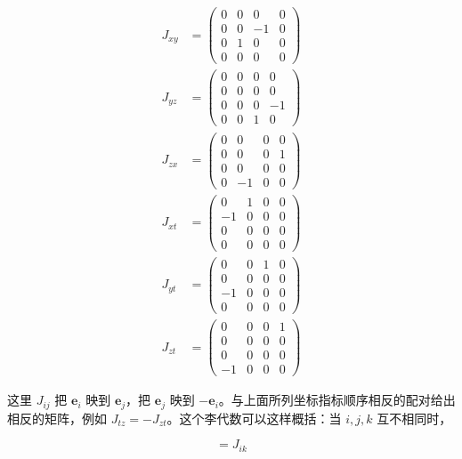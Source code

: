 \begin{align}
J_{xy} &= \begin{pmatrix} 0 & 0 & 0 & 0 \\ 0 & 0 & -1 & 0 \\ 0 & 1 & 0 & 0 \\ 0 & 0 & 0 & 0 \end{pmatrix} \\
J_{yz} &= \begin{pmatrix} 0 & 0 & 0 & 0 \\ 0 & 0 & 0 & 0 \\ 0 & 0 & 0 & -1 \\ 0 & 0 & 1 & 0 \end{pmatrix} \\
J_{zx} &= \begin{pmatrix} 0 & 0 & 0 & 0 \\ 0 & 0 & 0 & 1 \\ 0 & 0 & 0 & 0 \\ 0 & -1 & 0 & 0 \end{pmatrix} \\
J_{xt} &= \begin{pmatrix} 0 & 1 & 0 & 0 \\ -1 & 0 & 0 & 0 \\ 0 & 0 & 0 & 0 \\ 0 & 0 & 0 & 0 \end{pmatrix} \\
J_{yt} &= \begin{pmatrix} 0 & 0 & 1 & 0 \\ 0 & 0 & 0 & 0 \\ -1 & 0 & 0 & 0 \\ 0 & 0 & 0 & 0 \end{pmatrix} \\
J_{zt} &= \begin{pmatrix} 0 & 0 & 0 & 1 \\ 0 & 0 & 0 & 0 \\ 0 & 0 & 0 & 0 \\ -1 & 0 & 0 & 0 \end{pmatrix}
\end{align}

这里 $J_{ij}$ 把 $\mathbf{e}_i$ 映到 $\mathbf{e}_j$，把 $\mathbf{e}_j$ 映到 $-\mathbf{e}_i$。与上面所列坐标指标顺序相反的配对给出相反的矩阵，例如 $J_{tz}=-J_{zt}$。这个李代数可以这样概括：当 $i,j,k$ 互不相同时，

\begin{equation}
[J_{ij}, J_{kj}] = J_{ik}
\end{equation}


